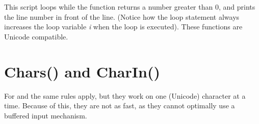 This script loops while the function  returns a number greater than 0, and prints the line number in front of the line. (Notice how the loop statement always increases the loop variable \emph{i} when the loop is executed). These functions are Unicode compatible.

\section{Chars() and CharIn()}
For  and  the same rules apply, but they work on one (Unicode) character at a time. Because of this, they are not as fast, as they cannot optimally use a buffered input mechanism.

  




